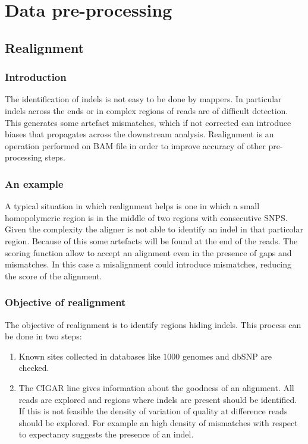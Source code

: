 \chapter{Data pre-processing}

\section{Realignment}

	\subsection{Introduction}
	The identification of indels is not easy to be done by mappers.
	In particular indels across the ends or in complex regions of reads are of difficult detection.
	This generates some artefact mismatches, which if not corrected can introduce biases that propagates across the downstream analysis.
	Realignment is an operation performed on BAM file in order to improve accuracy of other pre-processing steps.

	\subsection{An example}
	A typical situation in which realignment helps is one in which a small homopolymeric region is in the middle of two regions with consecutive SNPS.
	Given the complexity the aligner is not able to identify an indel in that particolar region.
	Because of this some artefacts will be found at the end of the reads.
	The scoring function allow to accept an alignment even in the presence of gaps and mismatches.
	In this case a misalignment could introduce mismatches, reducing the score of the alignment.

	\subsection{Objective of realignment}
	The objective of realignment is to identify regions hiding indels.
	This process can be done in two steps:

	\begin{multicols}{2}
		\begin{enumerate}
			\item Known sites collected in databases like $1000$ genomes and dbSNP are checked.
			\item The CIGAR line gives information about the goodness of an alignment.
				All reads are explored and regions where indels are present should be identified.
				If this is not feasible the density of variation of quality at difference reads should be explored.
				For example an high density of mismatches with respect to expectancy suggests the presence of an indel.
		\end{enumerate}
	\end{multicols}

